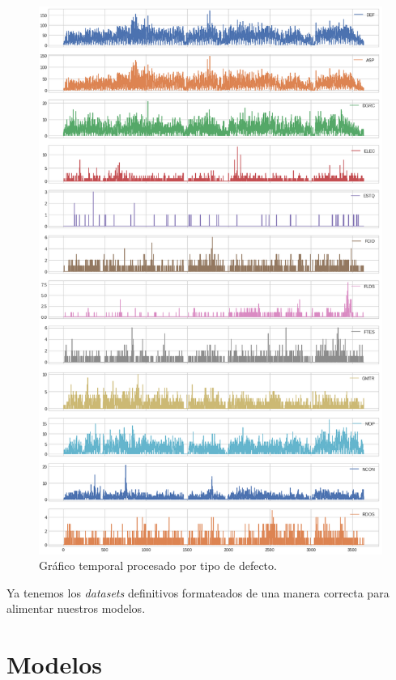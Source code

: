 \documentclass[a4paper,12pt]{article}
\begin{document}
\begin{figure}[H]
	\begin{center}
	\includegraphics[width=1\textwidth]{multi_post_flia.png}
  	\caption{Gráfico temporal procesado por tipo de defecto.}
  	\label{fig:graf_post_mult_tipo}
  	\end{center}
\end{figure}

Ya tenemos los \textit{datasets} definitivos formateados de una manera correcta para alimentar nuestros modelos.

\section{Modelos}
\end{document}
